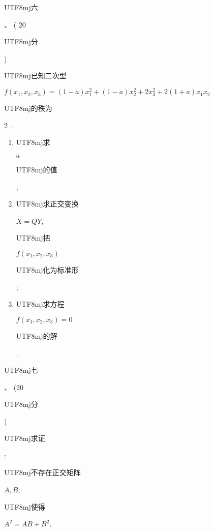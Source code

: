 \documentclass[10pt]{article}
\begin{document}
\begin{CJK}{UTF8}{mj}六\end{CJK}、 ( 20 \begin{CJK}{UTF8}{mj}分\end{CJK}) \begin{CJK}{UTF8}{mj}已知二次型\end{CJK} $f\left(x_{1}, x_{2}, x_{3}\right)=(1-a) x_{1}^{2}+(1-a) x_{2}^{2}+2 x_{3}^{2}+2(1+a) x_{1} x_{2}$ \begin{CJK}{UTF8}{mj}的秩为\end{CJK} 2 .

\begin{enumerate}
  \item \begin{CJK}{UTF8}{mj}求\end{CJK} $a$ \begin{CJK}{UTF8}{mj}的值\end{CJK};

  \item \begin{CJK}{UTF8}{mj}求正交变换\end{CJK} $X=Q Y$, \begin{CJK}{UTF8}{mj}把\end{CJK} $f\left(x_{1}, x_{2}, x_{3}\right)$ \begin{CJK}{UTF8}{mj}化为标准形\end{CJK};

  \item \begin{CJK}{UTF8}{mj}求方程\end{CJK} $f\left(x_{1}, x_{2}, x_{3}\right)=0$ \begin{CJK}{UTF8}{mj}的解\end{CJK}.

\end{enumerate}
\begin{CJK}{UTF8}{mj}七\end{CJK}、 (20 \begin{CJK}{UTF8}{mj}分\end{CJK}) \begin{CJK}{UTF8}{mj}求证\end{CJK}: \begin{CJK}{UTF8}{mj}不存在正交矩阵\end{CJK} $A, B$, \begin{CJK}{UTF8}{mj}使得\end{CJK} $A^{2}=A B+B^{2}$.
\end{document}
